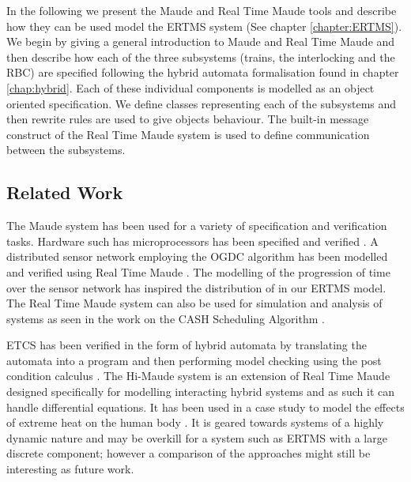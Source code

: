 \newcommand{\rtmaude}{Real Time Maude}

\label{chap:modelertms}

In the following we present the Maude \cite{MC03,Maude} and Real Time Maude \cite{PO02,PO04,RTMaude} tools and describe how they can be used model the ERTMS system (See chapter \ref{chapter:ERTMS}).   We begin by giving a general introduction to Maude and Real Time Maude and then describe how each of the three subsystems (trains, the interlocking and the RBC) are specified following the hybrid automata formalisation found in chapter \ref{chap:hybrid}. Each of these individual components is modelled as an object oriented specification. We define classes representing each of the subsystems and then rewrite rules are used to give objects behaviour. The  built-in message construct of the Real Time Maude system is used to define communication between the subsystems. 

\subsection*{Related Work}
The Maude system has been used for a variety of specification and verification tasks. Hardware such has microprocessors has been specified and verified \cite{NH00}. A distributed sensor network employing the OGDC algorithm has been modelled and verified using Real Time Maude \cite{PO07}. The modelling of the progression of time over the sensor network has inspired the distribution of in our ERTMS model. The Real Time Maude system can also be used for simulation and analysis of systems as seen in the work on the CASH Scheduling Algorithm \cite{PO06}. 

ETCS has been verified in the form of hybrid automata by translating the automata into a program and then performing model checking using the post condition calculus \cite{DI13}. The Hi-Maude system \cite{MF11} is an extension of Real Time Maude designed specifically for modelling interacting hybrid systems and as such it can handle differential equations. It has been used in a case study to model the effects of extreme heat on the human body \cite{MF12}. It is geared towards systems of a highly dynamic nature and may be overkill for a system such as ERTMS with a large discrete component; however a comparison of the approaches might still be interesting as future work.


